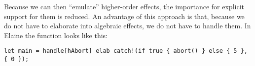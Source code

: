 Because we can then ``emulate'' higher-order effects, the importance for explicit support for them is reduced. An advantage of this approach is that, because we do not have to elaborate into algebraic effects, we do not have to handle them. In Elaine the  function looks like this:

\begin{lstlisting}[language=elaine,style=fancy]
let main = handle[hAbort] elab catch!(if true { abort() } else { 5 }, { 0 });
\end{lstlisting}

